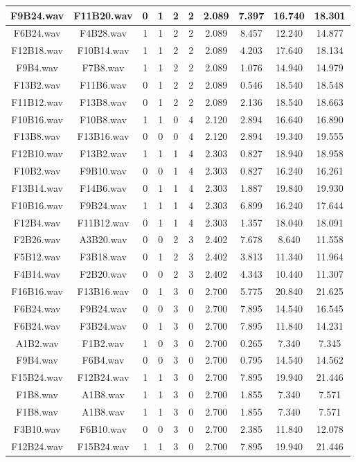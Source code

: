 \documentclass[11pt,a4paper,twoside]{book}
\begin{document}
\begin{longtable}[c]{|c|c|c|c|c|c|c|c|c|c|}
F9B24.wav&F11B20.wav&0&1&2&2&2.089&7.397&16.740&18.301\\ \hline
F6B24.wav&F4B28.wav&1&1&2&2&2.089&8.457&12.240&14.877\\ \hline
F12B18.wav&F10B14.wav&1&1&2&2&2.089&4.203&17.640&18.134\\ \hline
F9B4.wav&F7B8.wav&1&1&2&2&2.089&1.076&14.940&14.979\\ \hline
F13B2.wav&F11B6.wav&0&1&2&2&2.089&0.546&18.540&18.548\\ \hline
F11B12.wav&F13B8.wav&0&1&2&2&2.089&2.136&18.540&18.663\\ \hline
F10B16.wav&F10B8.wav&1&1&0&4&2.120&2.894&16.640&16.890\\ \hline
F13B8.wav&F13B16.wav&0&0&0&4&2.120&2.894&19.340&19.555\\ \hline
F12B10.wav&F13B2.wav&1&1&1&4&2.303&0.827&18.940&18.958\\ \hline
F10B2.wav&F9B10.wav&0&0&1&4&2.303&0.827&16.240&16.261\\ \hline
F13B14.wav&F14B6.wav&0&1&1&4&2.303&1.887&19.840&19.930\\ \hline
F10B16.wav&F9B24.wav&1&1&1&4&2.303&6.899&16.240&17.644\\ \hline
F12B4.wav&F11B12.wav&0&1&1&4&2.303&1.357&18.040&18.091\\ \hline
F2B26.wav&A3B20.wav&0&0&2&3&2.402&7.678&8.640&11.558\\ \hline
F5B12.wav&F3B18.wav&0&1&2&3&2.402&3.813&11.340&11.964\\ \hline
F4B14.wav&F2B20.wav&0&0&2&3&2.402&4.343&10.440&11.307\\ \hline
F16B16.wav&F13B16.wav&0&1&3&0&2.700&5.775&20.840&21.625\\ \hline
F6B24.wav&F9B24.wav&0&0&3&0&2.700&7.895&14.540&16.545\\ \hline
F6B24.wav&F3B24.wav&0&1&3&0&2.700&7.895&11.840&14.231\\ \hline
A1B2.wav&F1B2.wav&1&0&3&0&2.700&0.265&7.340&7.345\\ \hline
F9B4.wav&F6B4.wav&0&0&3&0&2.700&0.795&14.540&14.562\\ \hline
F15B24.wav&F12B24.wav&1&1&3&0&2.700&7.895&19.940&21.446\\ \hline
F1B8.wav&A1B8.wav&1&1&3&0&2.700&1.855&7.340&7.571\\ \hline
F1B8.wav&A1B8.wav&1&1&3&0&2.700&1.855&7.340&7.571\\ \hline
F3B10.wav&F6B10.wav&0&0&3&0&2.700&2.385&11.840&12.078\\ \hline
F12B24.wav&F15B24.wav&1&1&3&0&2.700&7.895&19.940&21.446\\ \hline

\end{longtable}
\end{document}
